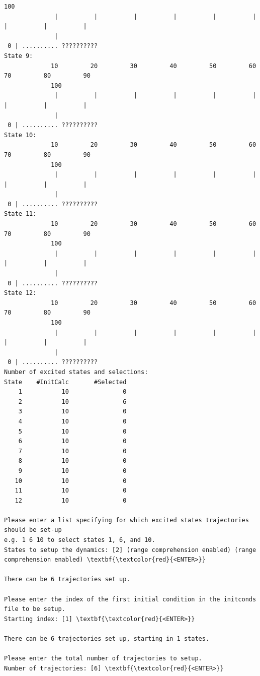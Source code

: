 \documentclass[a4paper,11pt,DIV=15,openany]{scrbook}
\begin{document}
\begin{oframed}
\begin{Verbatim}[commandchars=\\\{\}]
             100
              |          |          |          |          |          |          |          |          |          
              |
 0 | .......... ?????????? 
State 9:
             10         20         30         40         50         60         70         80         90         
             100
              |          |          |          |          |          |          |          |          |          
              |
 0 | .......... ?????????? 
State 10:
             10         20         30         40         50         60         70         80         90         
             100
              |          |          |          |          |          |          |          |          |          
              |
 0 | .......... ?????????? 
State 11:
             10         20         30         40         50         60         70         80         90         
             100
              |          |          |          |          |          |          |          |          |          
              |
 0 | .......... ?????????? 
State 12:
             10         20         30         40         50         60         70         80         90         
             100
              |          |          |          |          |          |          |          |          |          
              |
 0 | .......... ?????????? 
Number of excited states and selections:
State    #InitCalc       #Selected
    1           10               0
    2           10               6
    3           10               0
    4           10               0
    5           10               0
    6           10               0
    7           10               0
    8           10               0
    9           10               0
   10           10               0
   11           10               0
   12           10               0

Please enter a list specifying for which excited states trajectories should be set-up
e.g. 1 6 10 to select states 1, 6, and 10.
States to setup the dynamics: [2] (range comprehension enabled) (range comprehension enabled) \textbf{\textcolor{red}{<ENTER>}}

There can be 6 trajectories set up.

Please enter the index of the first initial condition in the initconds file to be setup.
Starting index: [1] \textbf{\textcolor{red}{<ENTER>}}

There can be 6 trajectories set up, starting in 1 states.

Please enter the total number of trajectories to setup.
Number of trajectories: [6] \textbf{\textcolor{red}{<ENTER>}}


\end{Verbatim}
\end{oframed}
\end{document}
